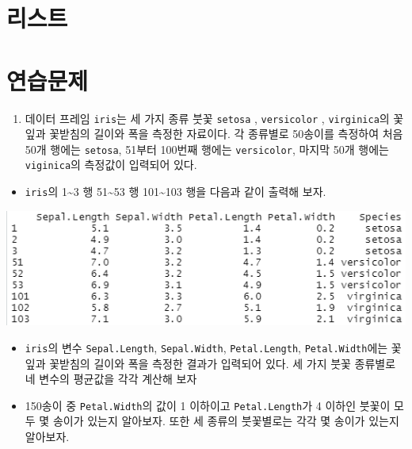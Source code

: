 \documentclass[
]{book}
\providecommand{\tightlist}{%
  \setlength{\itemsep}{0pt}\setlength{\parskip}{0pt}}
\begin{document}
\hypertarget{section-list}{%
\section{리스트}\label{section-list}}

\hypertarget{uxc5f0uxc2b5uxbb38uxc81c}{%
\section{연습문제}\label{uxc5f0uxc2b5uxbb38uxc81c}}

\begin{enumerate}
\def\labelenumi{\arabic{enumi}.}
\tightlist
\item
  데이터 프레임 \texttt{iris}는 세 가지 종류 붓꽃 \texttt{setosa} , \texttt{versicolor} , \texttt{virginica}의 꽃잎과 꽃받침의 길이와 폭을 측정한 자료이다. 각 종류별로 50송이를 측정하여 처음 50개 행에는 \texttt{setosa}, 51부터 100번째 행에는 \texttt{versicolor}, 마지막 50개 행에는 \texttt{viginica}의 측정값이 입력되어 있다.
\end{enumerate}

\begin{itemize}
\tightlist
\item
  \texttt{iris}의 1\textasciitilde3 행 51\textasciitilde53 행 101\textasciitilde103 행을 다음과 같이 출력해 보자.
\end{itemize}

\includegraphics[width=5.95833in,height=\textheight]{Figure/ch2_ex_21_1.png}

\begin{itemize}
\item
  \texttt{iris}의 변수 \texttt{Sepal.Length}, \texttt{Sepal.Width}, \texttt{Petal.Length}, \texttt{Petal.Width}에는 꽃잎과 꽃받침의 길이와 폭을 측정한 결과가 입력되어 있다. 세 가지 붓꽃 종류별로 네 변수의 평균값을 각각 계산해 보자
\item
  150송이 중 \texttt{Petal.Width}의 값이 1 이하이고 \texttt{Petal.Length}가 4 이하인 붓꽃이 모두 몇 송이가 있는지 알아보자. 또한 세 종류의 붓꽃별로는 각각 몇 송이가 있는지 알아보자.
\end{itemize}
\end{document}
